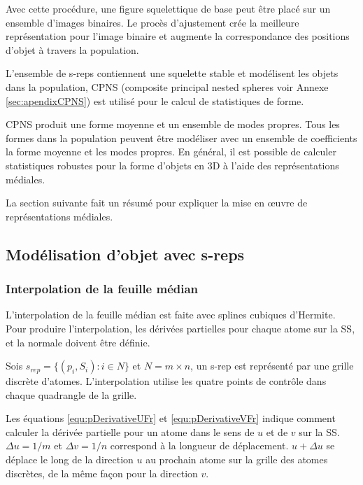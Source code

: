 Avec cette procédure, une figure squelettique de base peut être placé sur 
un ensemble d'images binaires. Le procès d'ajustement crée la meilleure représentation
pour l'image binaire et augmente la correspondance des positions d'objet à travers la population.

L'ensemble de s-reps contiennent une squelette stable et modélisent les objets dans la population, 
CPNS (composite principal nested spheres voir Annexe \ref{sec:apendixCPNS}) est utilisé pour le calcul
de statistiques de forme.

CPNS produit une forme moyenne et un ensemble de modes propres.
Tous les formes dans la population peuvent être modéliser
avec un ensemble de coefficients la forme moyenne et les modes propres.
En général, il est possible de calculer statistiques robustes pour la forme d'objets 
en 3D à l'aide des représentations médiales.
 
La section suivante fait un résumé pour expliquer 
la mise en œuvre de représentations médiales.

\subsection{Modélisation d'objet avec s-reps}
\label{sec:s-repImplementationfr}

\subsubsection{Interpolation de la feuille médian}

L'interpolation de la feuille médian est faite avec splines cubiques d'Hermite.
Pour produire l'interpolation, les dérivées partielles pour chaque atome sur la SS,
et la normale doivent être définie.

Sois $s_{rep} = \{(p_i, S_i) : i \in N\}$ et $N = m \times n$, 
un s-rep est représenté par une grille discrète d'atomes.
L'interpolation utilise les quatre points de contrôle dans chaque quadrangle de la grille.

Les équations \ref{equ:pDerivativeUFr} et \ref{equ:pDerivativeVFr} indique comment calculer la dérivée partielle pour un atome 
dans le sens de $u$ et de $v$ sur la SS. $\Delta u = 1/m$ et $\Delta v = 1/n$
correspond à la longueur de déplacement. $u + \Delta u$ se déplace le long de la direction $u$ au
prochain atome sur la grille des atomes discrètes, de la même façon pour la direction $v$.

